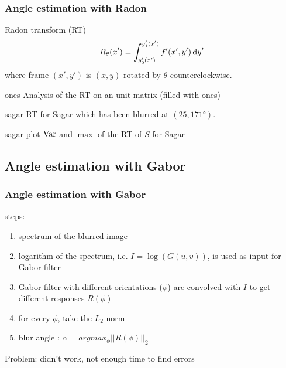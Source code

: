 \begin{frame}[allowframebreaks]
  \frametitle{Angle estimation with Radon}
  \begin{block}{Radon transform (RT)}
    \[ R_\theta(x') = \int_{y_0'(x')}^{y_1'(x')} f'(x',y') \operatorname{d}\! y' \]
    where frame $(x',y')$ is $(x,y)$ rotated by $\theta$ counterclockwise.
  \end{block}

  \begin{myfig}{ones}
    {Analysis of the RT on an unit matrix (filled with ones)}
  \end{myfig}

  \begin{myfig}{sagar}
    {RT for Sagar which has been blurred at $(25,\ang{171})$.}
  \end{myfig}

  \begin{myfig}{sagar-plot}
    {$\operatorname{Var}$ and $\max$ of the RT of $S$ for Sagar}
  \end{myfig}
\end{frame}

\subsection{Angle estimation with Gabor}
\begin{frame}
	\frametitle{Angle estimation with Gabor}
	steps:
	\begin{enumerate}
	\item spectrum of the blurred image
	\item logarithm of the spectrum, i.e. $I=\log(G(u,v))$, is used as input for Gabor filter
	\item Gabor filter with different orientations ($\phi$) are convolved with $I$ to get different responses $R(\phi)$
	\item for every $\phi$, take the $L_2$ norm
	\item blur angle : $\alpha = arg{max_{\phi}||R(\phi)||_2}$
	\end{enumerate}
	
	Problem: didn't work, not enough time to find errors
\end{frame}


